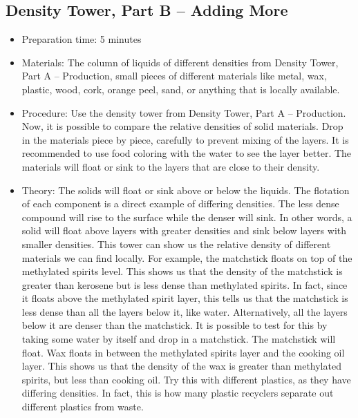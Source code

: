 \subsection{Density Tower, Part B – Adding More}
\begin{itemize}
\item{Preparation time: 5 minutes}
\item{Materials: The column of liquids of different densities from Density Tower, Part A -- Production, small pieces of different materials like metal, wax, plastic, wood, cork, orange peel, sand, or anything that is locally available.}
\item{Procedure: Use the density tower from Density Tower, Part A -- Production. Now, it is possible to compare the relative densities of solid materials. Drop in the materials piece by piece, carefully to prevent mixing of the layers. It is recommended to use food coloring with the water to see the layer better. The materials will float or sink to the layers that are close to their density.}
\item{Theory: The solids will float or sink above or below the liquids. The flotation of each component is a direct example of differing densities. The less dense compound will rise to the surface while the denser will sink. In other words, a solid will float above layers with greater densities and sink below layers with smaller densities. This tower can show us the relative density of different materials we can find locally. For example, the matchstick floats on top of the methylated spirits level. This shows us that the density of the matchstick is greater than kerosene but is less dense than methylated spirits. In fact, since it floats above the methylated spirit layer, this tells us that the matchstick is less dense than all the layers below it, like water. Alternatively, all the layers below it are denser than the matchstick. It is possible to test for this by taking some water by itself and drop in a matchstick. The matchstick will float. Wax floats in between the methylated spirits layer and the cooking oil layer. This shows us that the density of the wax is greater than methylated spirits, but less than cooking oil. Try this with different plastics, as they have differing densities. In fact, this is how many plastic recyclers separate out different plastics from waste.}
\end{itemize}

